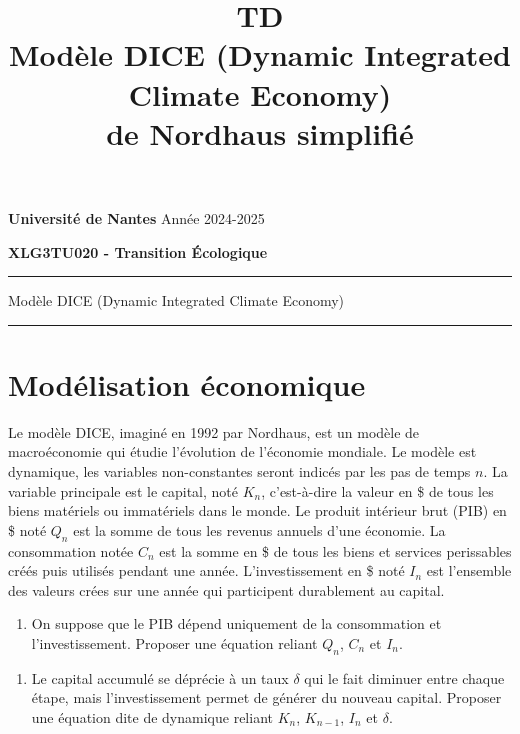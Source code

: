 \documentclass[12pt,a4paper]{article}
\title{TD \\Modèle 
DICE (Dynamic Integrated Climate Economy) \\
de Nordhaus simplifié }
\newcommand{\rep}[1]{\textit{Réponse :} #1 \\}
\renewcommand{\rep}[1]{ }
\theoremstyle{remark}
\begin{document}
	\noindent
	{\textbf{Universit\'e de Nantes} \hfill Ann\'ee 2024-2025}\\
	{\textbf{XLG3TU020 - Transition Écologique}\\
		\medskip
\medskip
\medskip
\medskip

		
		\hrule
		\begin{center} {\Large \sc Modèle DICE (Dynamic Integrated Climate Economy)}
		\end{center}
		\hrule
		\bigskip
		


\medskip
\medskip


\section*{\sc Modélisation économique}

Le modèle DICE, imaginé en 1992 par Nordhaus, est un modèle de macroéconomie qui étudie l'évolution de l'économie mondiale.
Le modèle est dynamique, les variables non-constantes seront indicés par les pas de temps $n$.
La variable principale est le capital, noté $K_n$, c'est-à-dire la valeur en \$ de tous les biens matériels ou immatériels dans le monde.
Le produit intérieur brut (PIB) en \$ noté $Q_n$ est la somme de tous les revenus annuels d'une économie.
La consommation notée $C_n$ est la somme en \$ de tous les biens et services perissables créés puis utilisés pendant une année.
L'investissement en \$ noté $I_n$ est l'ensemble des valeurs crées sur une année qui participent durablement au capital.

\begin{enumerate}
\item On suppose que le PIB dépend uniquement de la consommation et l'investissement. Proposer une équation reliant $Q_n$, $C_n$ et $I_n$.
\end{enumerate}
\rep{ $Q_{n}=C_n + I_n$ }
\begin{enumerate}[resume]
\item  Le capital accumulé se déprécie à un taux $\delta$ qui le fait diminuer entre chaque étape, mais l'investissement permet de générer du nouveau capital. Proposer une équation dite de dynamique reliant $K_{n}$, $K_{n-1}$, $I_n$ et $\delta$.
\end{enumerate}
\rep{ $K_{n}=(1-\delta)K_{n-1}+I_n$ }

}
\end{document}
